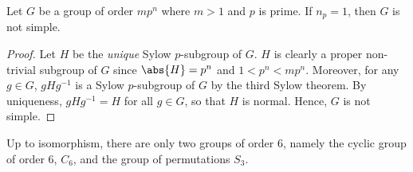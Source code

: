 \begin{prop} \label{prop:unique-sylow-not-simple}
    Let $G$ be a group of order $mp^n$ where $m >1$ and $p$ is prime. If $n_p = 1$, then $G$ is not simple.
\end{prop}
\begin{proof}
    Let $H$ be the \emph{unique} Sylow $p$-subgroup of $G$. $H$ is clearly a proper non-trivial subgroup of $G$ since $\abs{H} = p^n$ and $1 < p^n < mp^n$. Moreover, for any $g \in G$, $gHg^{-1}$ is a Sylow $p$-subgroup of $G$ by the third Sylow theorem. By uniqueness, $gHg^{-1} = H$ for all $g \in G$, so that $H$ is normal. Hence, $G$ is not simple.
\end{proof}

\begin{theorem} \label{thm:class-6}
    Up to isomorphism, there are only two groups of order $6$, namely the cyclic group of order $6$, $C_6$, and the group of permutations $S_3$.
\end{theorem}

